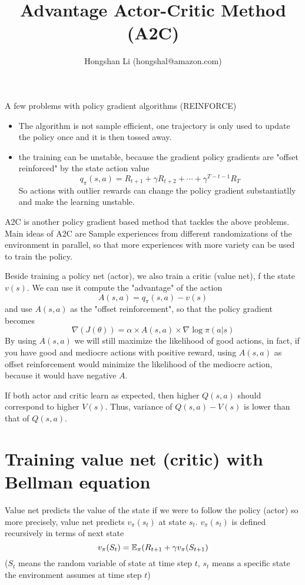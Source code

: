 \documentclass{article}
\title{Advantage Actor-Critic Method (A2C)}
\author{Hongshan Li (hongshal@amazon.com)}
\begin{document}
\maketitle

A few problems with policy gradient algorithms (REINFORCE)
\begin{itemize}
    \item The algorithm is not sample efficient, one trajectory
        is only used to update the policy once and it is then
        tossed away.
    \item the training can be unstable, because the gradient 
        policy gradients are "offset reinforced" by the
        state action value 
        \[
            q_{\pi}(s, a) = R_{t+1} + \gamma R_{t+2} + \cdots + 
                \gamma^{T-t-1}R_T
        \]
        So actions with outlier rewards can change the policy gradient
        substantiatlly and make the learning unstable. 
\end{itemize}

    
A2C is another policy gradient based method that tackles the above problems. 
Main ideas of A2C are
Sample experiences from different randomizations of the environment 
in parallel, so that more experiences with more variety can be used 
to train the policy. 

Beside training a policy net (actor), we also train a critic (value net),
f the state $v(s)$. We can use it compute the 
"advantage" of the action
\[
  A(s, a) = q_{\pi}(s, a) - v(s)
\]
and use $A(s, a)$ as the "offset reinforcement", so that the policy gradient 
becomes
\[
  \nabla(J(\theta)) = \alpha \times A(s, a) \times \nabla\log\pi(a|s)
\]
By using $A(s, a)$ we will still maximize the likelihood of good actions,
in fact, if you have good and mediocre actions with positive reward, 
using $A(s, a)$ as offset reinforcement would minimize the likelihood
of the mediocre action, because it would have negative $A$. 

If both actor and critic learn as expected, then higher $Q(s, a)$ 
should correspond to higher $V(s)$. Thus, variance of $Q(s, a) - V(s)$
is lower than that of $Q(s,a)$. 

\section{Training value net (critic) with Bellman equation}
Value net predicts the value of the state if we were to follow the policy (actor)
so more precisely, value net predicts $v_{\pi}(s_t)$ at state $s_t$. 
$v_{\pi}(s_t)$ is defined recursively in terms of next state
\[
  v_{\pi}(S_t) = \mathbb{E}_{\pi}(R_{t+1} + \gamma v_{\pi}(S_{t+1})
\]
($S_t$ means the random variable of state at time step $t$, $s_t$ means 
a specific state the environment assumes at time step $t$)
\end{document}
